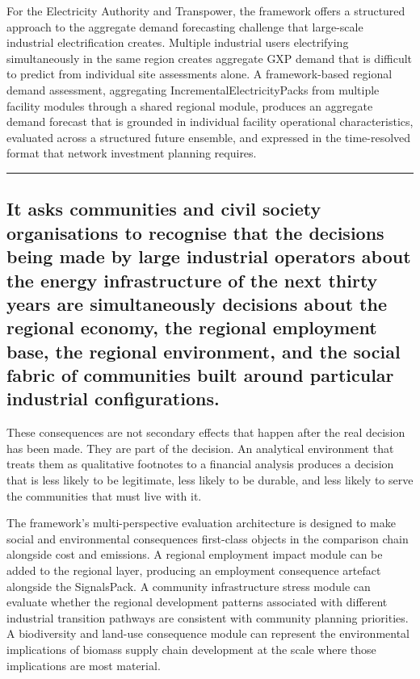\documentclass[
  11pt,
  a4paper,
  twoside,
  openright]{scrbook}
\begin{document}
For the Electricity Authority and Transpower, the framework offers a
structured approach to the aggregate demand forecasting challenge that
large-scale industrial electrification creates. Multiple industrial
users electrifying simultaneously in the same region creates aggregate
GXP demand that is difficult to predict from individual site assessments
alone. A framework-based regional demand assessment, aggregating
IncrementalElectricityPacks from multiple facility modules through a
shared regional module, produces an aggregate demand forecast that is
grounded in individual facility operational characteristics, evaluated
across a structured future ensemble, and expressed in the time-resolved
format that network investment planning requires.

\begin{center}\rule{0.5\linewidth}{0.5pt}\end{center}

\subsection{It asks communities and civil society organisations to
recognise that the decisions being made by large industrial operators
about the energy infrastructure of the next thirty years are
simultaneously decisions about the regional economy, the regional
employment base, the regional environment, and the social fabric of
communities built around particular industrial
configurations.}\label{it-asks-communities-and-civil-society-organisations-to-recognise-that-the-decisions-being-made-by-large-industrial-operators-about-the-energy-infrastructure-of-the-next-thirty-years-are-simultaneously-decisions-about-the-regional-economy-the-regional-employment-base-the-regional-environment-and-the-social-fabric-of-communities-built-around-particular-industrial-configurations.}

These consequences are not secondary effects that happen after the real
decision has been made. They are part of the decision. An analytical
environment that treats them as qualitative footnotes to a financial
analysis produces a decision that is less likely to be legitimate, less
likely to be durable, and less likely to serve the communities that must
live with it.

The framework's multi-perspective evaluation architecture is designed to
make social and environmental consequences first-class objects in the
comparison chain alongside cost and emissions. A regional employment
impact module can be added to the regional layer, producing an
employment consequence artefact alongside the SignalsPack. A community
infrastructure stress module can evaluate whether the regional
development patterns associated with different industrial transition
pathways are consistent with community planning priorities. A
biodiversity and land-use consequence module can represent the
environmental implications of biomass supply chain development at the
scale where those implications are most material.
\end{document}
